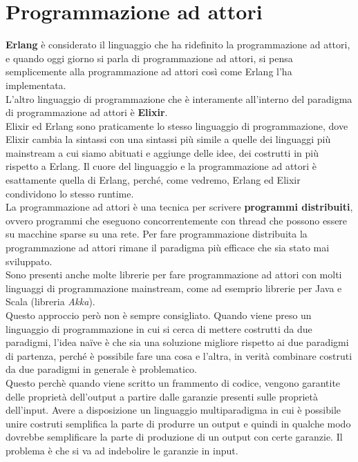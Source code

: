 \documentclass{article}
\begin{document}
\pagestyle{empty}

\section*{Programmazione ad attori}
\large

\textbf{Erlang} è considerato il linguaggio che ha ridefinito la programmazione ad attori, e quando oggi giorno si parla di programmazione ad attori, si pensa semplicemente alla programmazione ad attori così come Erlang l'ha implementata.\\
L'altro linguaggio di programmazione che è interamente all'interno del paradigma di programmazione ad attori è \textbf{Elixir}.\\
Elixir ed Erlang sono praticamente lo stesso linguaggio di programmazione, dove Elixir cambia la sintassi con una sintassi più simile a quelle dei linguaggi più mainstream a cui siamo abituati e aggiunge delle idee, dei costrutti in più rispetto a Erlang. Il cuore del linguaggio e la programmazione ad attori è esattamente quella di Erlang, perché, come vedremo, Erlang ed Elixir condividono lo stesso runtime.\vspace{14pt}\\
La programmazione ad attori è una tecnica per scrivere \textbf{programmi distribuiti}, ovvero programmi che eseguono concorrentemente con thread che possono essere su macchine sparse su una rete. Per fare programmazione distribuita la programmazione ad attori rimane il paradigma più efficace che sia stato mai sviluppato.\vspace{14pt}\\
Sono presenti anche molte librerie per fare programmazione ad attori con molti linguaggi di programmazione mainstream, come ad esemprio librerie per Java e Scala (libreria \textit{Akka}).\\
Questo approccio però non è sempre consigliato. Quando viene preso un linguaggio di programmazione in cui si cerca di mettere costrutti da due paradigmi, l'idea naïve è che sia una soluzione migliore rispetto ai due paradigmi di partenza, perché è possibile fare una cosa e l'altra, in verità combinare costruti da due paradigmi in generale è problematico.\vspace{14pt}\\
Questo perchè quando viene scritto un frammento di codice, vengono garantite delle proprietà dell'output a partire dalle garanzie presenti sulle proprietà dell'input. Avere a disposizione un linguaggio multiparadigma in cui è possibile unire costruti semplifica la parte di produrre un output e quindi in qualche modo dovrebbe semplificare la parte di produzione di un output con certe garanzie. Il problema è che si va ad indebolire le garanzie in input.\\
\end{document}
